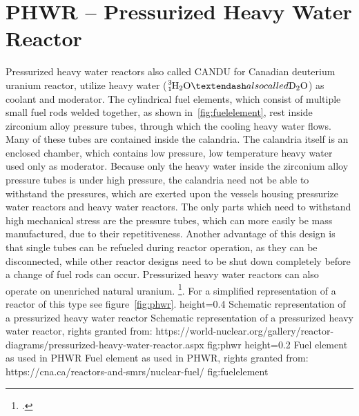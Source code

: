 \section{PHWR – Pressurized Heavy Water Reactor}
Pressurized heavy water reactors also called CANDU for Canadian deuterium uranium reactor, utilize
heavy water ($\ce{^{3}_{1}H_{2}O} – also called \ce{D_{2}O}$) as coolant and moderator. The cylindrical
fuel elements, which consist of multiple small fuel rods welded together, as shown in~\ref{fig:fuelelement},
rest inside zirconium alloy pressure tubes, through which the cooling heavy water flows. Many of these tubes are
contained inside the calandria. The calandria itself is an enclosed chamber, which contains low pressure,
low temperature heavy water used only as moderator. Because only the heavy water inside the zirconium alloy
pressure tubes is under high pressure, the calandria need not be able to withstand the pressures, which
are exerted upon the vessels housing pressurize water reactors and heavy water reactors. The only parts
which need to withstand high mechanical stress are the pressure tubes, which can more easily be mass
manufactured, due to their repetitiveness. Another advantage of this design is that single tubes can
be refueled  during reactor operation, as they can be disconnected, while other reactor designs need to be shut down completely
before a change of fuel rods can occur. Pressurized heavy water reactors can also operate on unenriched
natural uranium. \footcite[141-198]{engHandbook}. For a simplified representation of a reactor of this
type see figure~\ref{fig:phwr}.
    {height=0.4\textheight}
    {Schematic representation of a pressurized heavy water reactor}
    {Schematic representation of a pressurized heavy water reactor, rights granted from: https://world-nuclear.org/gallery/reactor-diagrams/pressurized-heavy-water-reactor.aspx}
    {fig:phwr}
    {height=0.2\textheight}
    {Fuel element as used in PHWR}
    {Fuel element as used in PHWR, rights granted from: https://cna.ca/reactors-and-smrs/nuclear-fuel/}
    {fig:fuelelement}
\pagebreak